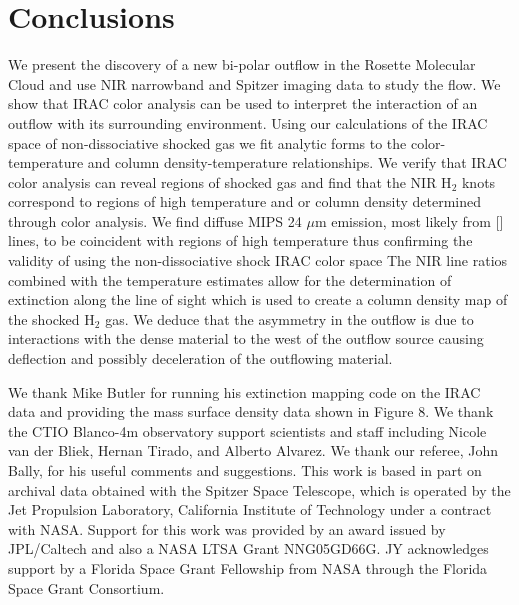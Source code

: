 \documentclass[iop]{emulateapj}
\begin{document}


\section{Conclusions}

We present the discovery of a new bi-polar outflow in the 
Rosette Molecular Cloud and use NIR narrowband
and Spitzer imaging data to study the flow. We show that 
IRAC color analysis can be used to interpret the interaction of an outflow with its surrounding environment.
Using our calculations of the IRAC space of non-dissociative shocked gas we fit analytic forms to the color-temperature and column density-temperature relationships. We verify that IRAC color analysis
can reveal regions of shocked gas and find that the NIR H$_{2}$ knots
correspond to regions of high temperature and or column density determined through color
 analysis.  
 We find diffuse MIPS 24 $\mu$m emission, most likely from [] lines, to be coincident 
 with regions of high temperature thus
 confirming the validity of using the 
 non-dissociative shock IRAC color space
 The NIR line ratios combined with the temperature estimates allow for the
 determination of extinction along the line of sight which is used to create
 a column density map of the shocked H$_{2}$ gas. 
 We deduce that the asymmetry in the outflow is due to interactions with the dense
material to the west of the outflow source causing deflection and possibly deceleration
of the outflowing material. 


\acknowledgments

We thank Mike Butler for running his extinction mapping code on the IRAC data
and providing the mass surface density data shown in Figure 8. 
We thank the CTIO Blanco-4m observatory support scientists and staff 
including Nicole van der Bliek,
Hernan Tirado, and Alberto Alvarez.
We thank our referee, John Bally, for his useful comments and
suggestions. 
This work is based in part on archival data obtained with the Spitzer
Space Telescope, which is operated by the Jet Propulsion Laboratory,
California Institute of Technology under a contract with NASA. Support
for this work was provided by an award issued by JPL/Caltech and also
a NASA LTSA Grant NNG05GD66G. JY acknowledges support by a
Florida Space Grant Fellowship from NASA through the 
Florida Space Grant Consortium.
\end{document}

